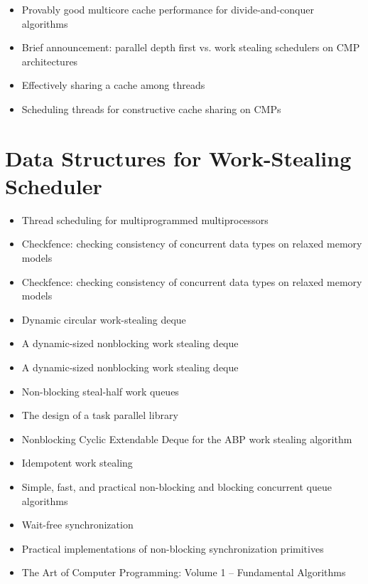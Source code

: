 \begin{itemize}
\item Provably good multicore cache performance for divide-and-conquer
  algorithms \cite{Blelloch2008}
\item Brief announcement: parallel depth first vs. work stealing
  schedulers on CMP architectures \cite{Liaskovitis2006}
\item Effectively sharing a cache among threads \cite{Blelloch2004}
\item Scheduling threads for constructive cache sharing on CMPs
  \cite{Chen2007}
\end{itemize}


\section*{Data Structures for Work-Stealing Scheduler}
\label{sec:lr-data-structures-for-work-stealing-scheduler}

\begin{itemize}
\item[\checkmark] Thread scheduling for multiprogrammed
  multiprocessors \cite{Arora2001}
\item Checkfence: checking consistency of concurrent data types on
  relaxed memory models \cite{Burckhardt2007}
\item Checkfence: checking consistency of concurrent data types on
  relaxed memory models \cite{Burckhardt2007a}
\item Dynamic circular work-stealing deque \cite{Chase2005}
\item A dynamic-sized nonblocking work stealing deque
  \cite{Hendler2006}
\item A dynamic-sized nonblocking work stealing deque
  \cite{Hendler2006a}
\item Non-blocking steal-half work queues \cite{Hendler2002}
\item The design of a task parallel library \cite{Leijen2009}
\item Nonblocking Cyclic Extendable Deque for the ABP work stealing
  algorithm \cite{Lev2005}
\item Idempotent work stealing \cite{Michael2009}
\item Simple, fast, and practical non-blocking and blocking concurrent
  queue algorithms \cite{Michael1996}
\item[\checkmark] Wait-free synchronization \cite{Herlihy1991}
\item[\checkmark] Practical implementations of non-blocking
  synchronization primitives \cite{Moir1997}
\item The Art of Computer Programming: Volume 1 -- Fundamental
  Algorithms \cite{Knuth1997}
\end{itemize}


